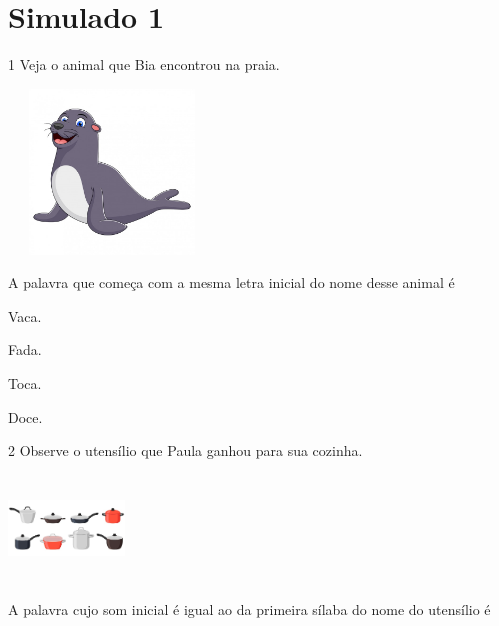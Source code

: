 \chapter{Simulado 1}

\num{1} Veja o animal que Bia encontrou na praia.

\includegraphics[width=2.16528in,height=1.72778in]{media/image139.jpeg}


A palavra que começa com a mesma letra inicial do nome desse animal é

\begin{escolha}
\item Vaca.

\item Fada.

\item Toca.

\item Doce.
\end{escolha}

\num{2} Observe o utensílio que Paula ganhou para sua cozinha.

\includegraphics[width=1.22222in,height=1.11389in]{media/image19.jpeg}


A palavra cujo som inicial é igual ao da primeira sílaba do nome do utensílio é

